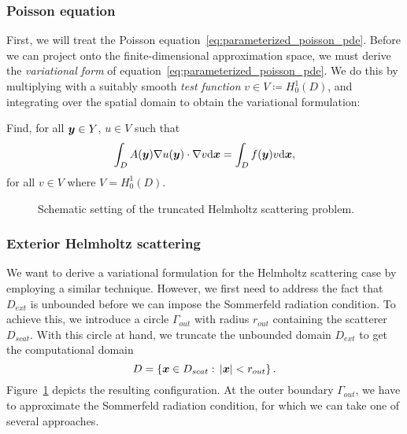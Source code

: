 \subsubsection{Poisson equation}
First, we will treat the Poisson equation~\eqref{eq:parameterized_poisson_pde}.
Before we can project onto the finite-dimensional approximation space, we must derive the \emph{variational form} of equation~\eqref{eq:parameterized_poisson_pde}.
We do this by multiplying with a suitably smooth \emph{test function} $v\in V\coloneqq H_0^1(D)$, and integrating over the spatial domain to obtain the variational formulation:

Find, for all ${\bm{y}}\in Y$, $u\in V$ such that
\begin{equation}
    \int_D A({\bm{y}}) \nabla u({\bm{y}}) \cdot \nabla v \mathrm{d}{{\bm{x}}} = \int_D f({\bm{y}})v \mathrm{d}{{\bm{x}}}\label{eq:varformpoisson},
\end{equation}
for all $v\in V$ where $V=H_0^1(D)$.

\begin{figure}
    \centering
    \caption{Schematic setting of the truncated Helmholtz scattering problem.}
    \label{fig:scat_tikz}
\end{figure}


\subsubsection{Exterior Helmholtz scattering}
We want to derive a variational formulation for the Helmholtz scattering case by employing a similar technique.
However, we first need to address the fact that $D_{ext}$ is unbounded before we can impose the Sommerfeld radiation condition.
To achieve this, we introduce a circle $\Gamma_{out}$ with radius $r_{out}$ containing the scatterer $D_{scat}$.
With this circle at hand, we truncate the unbounded domain $D_{ext}$ to get the computational domain
\begin{equation*}
    D = \left\{ {{\bm{x}}} \in D_{scat} :\, |{{\bm{x}}}| < r_{out} \right\}.
\end{equation*}
Figure~\ref{fig:scat_tikz} depicts the resulting configuration.
At the outer boundary $\Gamma_{out}$, we have to approximate the Sommerfeld radiation condition, for which we can take one of several approaches.

